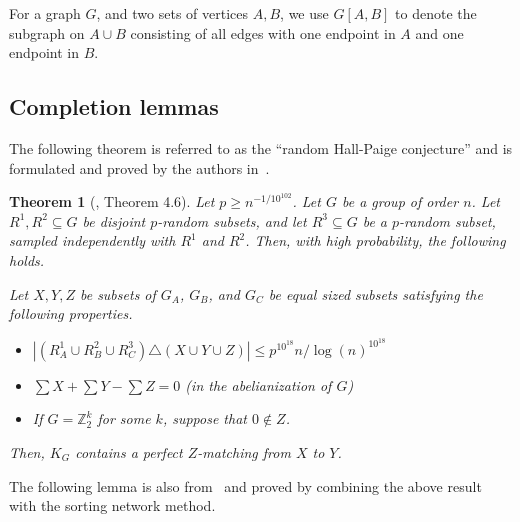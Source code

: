 \documentclass[a4paper,11pt,hidelinks]{amsart}
\newtheorem{theorem}{Theorem}[section]
\theoremstyle{definition}
\newcommand{\id}{{0}}%
\begin{document}
For a graph $G$, and two sets of vertices $A,B$, we use $G[A,B]$ to denote the subgraph on $A\cup B$ consisting of all edges with one endpoint in $A$ and one endpoint in $B$.

\subsection{Completion lemmas}\label{Section_completion_lemmas}
The following theorem is referred to as the ``random Hall-Paige conjecture'' and is formulated and proved by the authors in~\cite{muyesser2022random}.
\begin{theorem}[\cite{muyesser2022random}, Theorem 4.6]\label{thm:maintheoremsemidisjoint} Let $p\geq n^{-1/10^{102}}$. Let $G$ be a group of order $n$. Let $R^1,R^2\subseteq G$ be disjoint $p$-random subsets, and let $R^3\subseteq G$ be a $p$-random subset, sampled independently with $R^1$ and $R^2$. Then, with high probability, the following holds. 
\par Let $X,Y,Z$ be subsets of $G_A$, $G_B$, and $G_C$ be equal sized subsets satisfying the following properties.
\begin{itemize}
    \item $|(R^1_A\cup R^2_B\cup R^3_C) \triangle (X\cup Y\cup Z) |\leq p^{10^{18}}n/\log(n)^{10^{18}}$
    \item $\sum X+\sum Y - \sum Z = 0$ (in the abelianization of $G$)
    \item If $G=\mathbb{Z}_2^k$ for some $k$, suppose that $\id \notin Z$.
\end{itemize}
Then, $K_G$ contains a perfect $Z$-matching from $X$ to $Y$.%
\end{theorem}
The following lemma is also from~\cite{muyesser2022random} and proved by combining the above result with the sorting network method.
\end{document}
